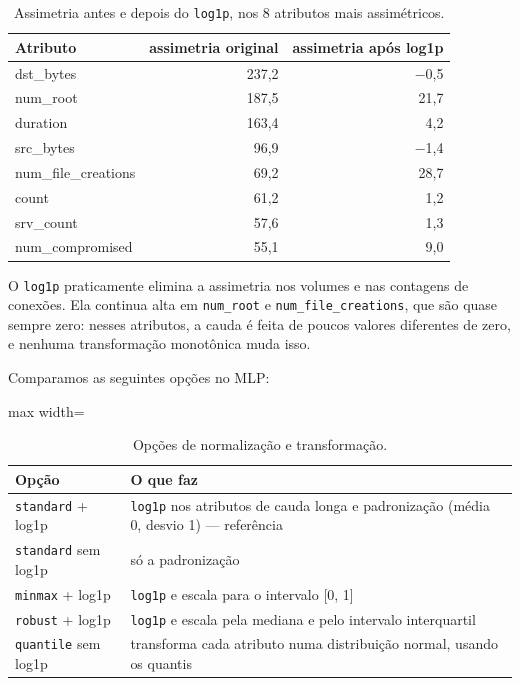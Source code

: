 \documentclass[11pt,a4paper]{article}
\begin{document}
\begin{table}[H]
\centering
\caption{Assimetria antes e depois do \texttt{log1p}, nos 8 atributos mais assimétricos.}
\begin{tabular}{lrr}
\toprule
Atributo & assimetria original & assimetria após log1p \\
\midrule
dst\_bytes & 237,2 & $-$0,5 \\
num\_root & 187,5 & 21,7 \\
duration & 163,4 & 4,2 \\
src\_bytes & 96,9 & $-$1,4 \\
num\_file\_creations & 69,2 & 28,7 \\
count & 61,2 & 1,2 \\
srv\_count & 57,6 & 1,3 \\
num\_compromised & 55,1 & 9,0 \\
\bottomrule
\end{tabular}
\end{table}

O \texttt{log1p} praticamente elimina a assimetria nos volumes e nas contagens de conexões. Ela continua alta em \texttt{num\_root} e \texttt{num\_file\_creations}, que são quase sempre zero: nesses atributos, a cauda é feita de poucos valores diferentes de zero, e nenhuma transformação monotônica muda isso.

Comparamos as seguintes opções no MLP:

\begin{table}[H]
\centering
\caption{Opções de normalização e transformação.}
\begin{adjustbox}{max width=\linewidth}
\begin{tabular}{lp{10cm}}
\toprule
Opção & O que faz \\
\midrule
\texttt{standard} + log1p & \texttt{log1p} nos atributos de cauda longa e padronização (média 0, desvio 1) --- referência \\
\texttt{standard} sem log1p & só a padronização \\
\texttt{minmax} + log1p & \texttt{log1p} e escala para o intervalo [0, 1] \\
\texttt{robust} + log1p & \texttt{log1p} e escala pela mediana e pelo intervalo interquartil \\
\texttt{quantile} sem log1p & transforma cada atributo numa distribuição normal, usando os quantis \\
\bottomrule
\end{tabular}
\end{adjustbox}
\end{table}
\end{document}
